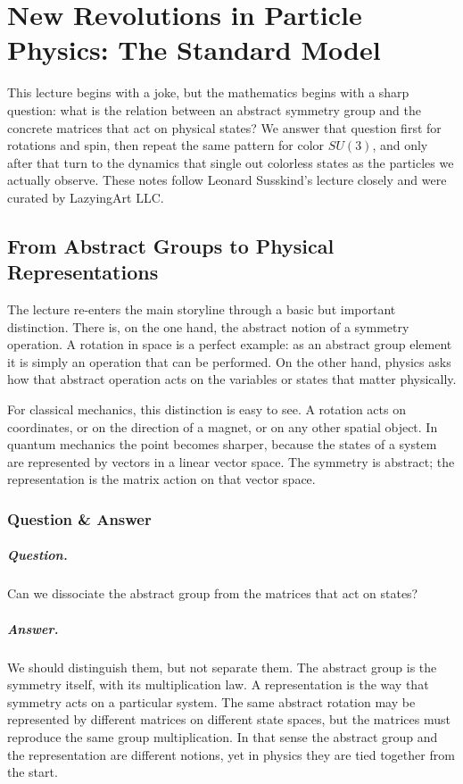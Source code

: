 \chapter{New Revolutions in Particle Physics: The Standard Model}

This lecture begins with a joke, but the mathematics begins with a sharp question: what is the relation between an abstract symmetry group and the concrete matrices that act on physical states? We answer that question first for rotations and spin, then repeat the same pattern for color \(SU(3)\), and only after that turn to the dynamics that single out colorless states as the particles we actually observe. These notes follow Leonard Susskind's lecture closely and were curated by LazyingArt LLC.

\section{From Abstract Groups to Physical Representations}

The lecture re-enters the main storyline through a basic but important distinction. There is, on the one hand, the abstract notion of a symmetry operation. A rotation in space is a perfect example: as an abstract group element it is simply an operation that can be performed. On the other hand, physics asks how that abstract operation acts on the variables or states that matter physically.

For classical mechanics, this distinction is easy to see. A rotation acts on coordinates, or on the direction of a magnet, or on any other spatial object. In quantum mechanics the point becomes sharper, because the states of a system are represented by vectors in a linear vector space. The symmetry is abstract; the representation is the matrix action on that vector space.

\subsection{Question \& Answer}

\paragraph{Question.} Can we dissociate the abstract group from the matrices that act on states?

\paragraph{Answer.} We should distinguish them, but not separate them. The abstract group is the symmetry itself, with its multiplication law. A representation is the way that symmetry acts on a particular system. The same abstract rotation may be represented by different matrices on different state spaces, but the matrices must reproduce the same group multiplication. In that sense the abstract group and the representation are different notions, yet in physics they are tied together from the start.

